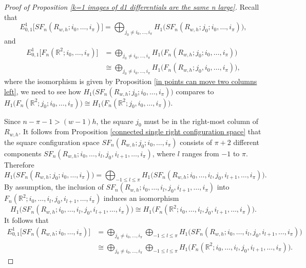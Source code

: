 \documentclass[pagebackref,colorlinks,citecolor=blue,linkcolor=blue,urlcolor=blue,filecolor=blue]{article}
\theoremstyle{definition}\newtheorem{definition}[thm]{Definition}
\theoremstyle{definition}
\newcommand{\R}{\ensuremath{\mathbb{R}}}
\begin{document}
\begin{proof}[Proof of Proposition \ref{k=1 images of d1 differentials are the same n large}]

Recall that
\[
E^{1}_{0,1}\big[SF_{n}(R_{w, h}; i_{0}, \dots, i_{\pi})\big]=\bigoplus_{j_{0}\neq i_{0}, \dots, i_{\pi}}H_{1}\big(SF_{n}(R_{w, h}; j_{0}; i_{0}, \dots, i_{\pi})\big),
\]
and 
\begin{align*}
E^{1}_{0,1}\big[F_{n}(\R^{2}; i_{0}, \dots, i_{\pi})\big]&=\bigoplus_{j_{0}\neq i_{0}, \dots, i_{\pi}}H_{1}\big(F_{n}(R_{w, h}; j_{0}; i_{0}, \dots, i_{\pi})\big)\\
&\cong\bigoplus_{j_{0}\neq i_{0}, \dots, i_{\pi}}H_{1}\big(F_{n}(R_{w, h}; j_{0}, i_{0}, \dots, i_{\pi})\big),
\end{align*}
where the isomorphism is given by Proposition \ref{in points can move two columns left}, we need to see how $H_{1}\big(SF_{n}(R_{w, h}; j_{0}; i_{0}, \dots, i_{\pi})\big)$ compares to $H_{1}\big(F_{n}(\R^{2}; j_{0}; i_{0}, \dots, i_{\pi})\big)\cong H_{1}\big(F_{n}(\R^{2}; j_{0}, i_{0}, \dots, i_{\pi})\big)$.

Since $n-\pi-1>(w-1)h$, the square $j_{0}$ must be in the right-most column of $R_{w,h}$.
It follows from Proposition \ref{connected single right configuration space} that the square configuration space $SF_{n}(R_{w, h}; j_{0}; i_{0}, \dots, i_{\pi})$ consists of $\pi+2$ different components $SF_{n}(R_{w, h}; i_{0}, \dots, i_{l}, j_{0}, i_{l+1},\dots, i_{\pi})$, where $l$ ranges from $-1$ to $\pi$.
Therefore
\[
H_{1}\big(SF_{n}(R_{w, h}; j_{0}; i_{0}, \dots, i_{\pi})\big)=\bigoplus_{-1\le l\le \pi}H_{1}\big(SF_{n}(R_{w, h}; i_{0}, \dots, i_{l}, j_{0}, i_{l+1},\dots, i_{\pi})\big).
\]
By assumption, the inclusion of $SF_{n}(R_{w, h}; i_{0}, \dots, i_{l}, j_{0}, i_{l+1},\dots, i_{\pi})$ into $F_{n}(\R^{2}; i_{0}, \dots, i_{l}, j_{0}, i_{l+1},\dots, i_{\pi})$ induces an isomorphism 
\[
H_{1}\big(SF_{n}(R_{w, h}; i_{0}, \dots, i_{l}, j_{0}, i_{l+1},\dots, i_{\pi})\big)\cong H_{1}\big(F_{n}(\R^{2}; i_{0}, \dots, i_{l}, j_{0}, i_{l+1},\dots, i_{\pi})\big).
\]
It follows that 
\begin{align*}
E^{1}_{0,1}\big[SF_{n}(R_{w, h}; i_{0}, \dots, i_{\pi})\big]&=\bigoplus_{j_{0}\neq i_{0}, \dots, i_{\pi}}\bigoplus_{-1\le l\le \pi}H_{1}\big(SF_{n}(R_{w, h}; i_{0}, \dots, i_{l}, j_{0}, i_{l+1},\dots, i_{\pi})\big)\\
&\cong \bigoplus_{j_{0}\neq i_{0}, \dots, i_{\pi}}\bigoplus_{-1\le l\le \pi}H_{1}\big(F_{n}(\R^{2}; i_{0}, \dots, i_{l}, j_{0}, i_{l+1},\dots, i_{\pi})\big).
\end{align*}


\end{proof}
\end{document}
